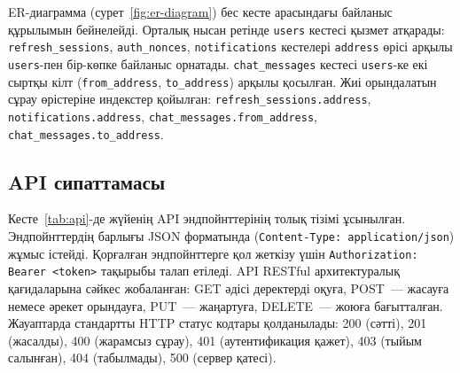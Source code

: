 \documentclass[14pt,a4paper]{extarticle}
\begin{document}
ER-диаграмма (сурет~\ref{fig:er-diagram}) бес кесте арасындағы байланыс құрылымын бейнелейді. Орталық нысан ретінде \texttt{users} кестесі қызмет атқарады: \texttt{refresh\_sessions}, \texttt{auth\_nonces}, \texttt{notifications} кестелері \texttt{address} өрісі арқылы \texttt{users}-пен бір-көпке байланыс орнатады. \texttt{chat\_messages} кестесі \texttt{users}-ке екі сыртқы кілт (\texttt{from\_address}, \texttt{to\_address}) арқылы қосылған. Жиі орындалатын сұрау өрістеріне индекстер қойылған: \texttt{refresh\_sessions.address}, \texttt{notifications.address}, \texttt{chat\_messages.from\_address}, \texttt{chat\_messages.to\_address}.

\subsection{API сипаттамасы}

Кесте~\ref{tab:api}-де жүйенің API эндпойнттерінің толық тізімі ұсынылған. Эндпойнттердің барлығы JSON форматында (\texttt{Content-Type: application/json}) жұмыс істейді. Қорғалған эндпойнттерге қол жеткізу үшін \texttt{Authorization: Bearer <token>} тақырыбы талап етіледі. API RESTful архитектуралық қағидаларына сәйкес жобаланған: GET әдісі деректерді оқуға, POST~--- жасауға немесе әрекет орындауға, PUT~--- жаңартуға, DELETE~--- жоюға бағытталған. Жауаптарда стандартты HTTP статус кодтары қолданылады: 200 (сәтті), 201 (жасалды), 400 (жарамсыз сұрау), 401 (аутентификация қажет), 403 (тыйым салынған), 404 (табылмады), 500 (сервер қатесі).
\end{document}
